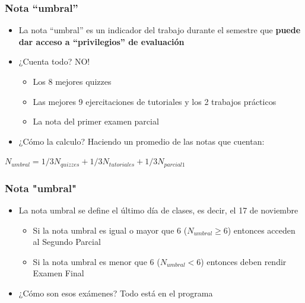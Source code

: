 \documentclass{beamer}
\begin{document}
\begin{frame}
\frametitle{Nota ``umbral''}
\begin{itemize}
    \item La nota ``umbral'' es un indicador del trabajo durante el semestre que \textbf{puede dar acceso a ``privilegios'' de evaluación} \vspace{2mm}
    \item ¿Cuenta todo? NO!
        \begin{itemize}
            \item Los 8 mejores quizzes
            \item Las mejores 9 ejercitaciones de tutoriales y los 2 trabajos prácticos
            \item La nota del primer examen parcial
        \end{itemize} \vspace{2mm}
    \item ¿Cómo la calculo? Haciendo un promedio de las notas que cuentan:
    \end{itemize}
    \begin{center}
    $N_{umbral}=1/3N_{quizzes}+1/3N_{tutoriales}+1/3N_{parcial 1}$    
    \end{center}
    
\end{frame}

\begin{frame}
\frametitle{Nota "umbral"}
\begin{itemize}
    \item La nota umbral se define el último día de clases, es decir, el 17 de noviembre    
    \begin{itemize} \vspace{2mm}
            \item Si la nota umbral es igual o mayor que 6 ($N_{umbral} \geq 6$) entonces acceden al Segundo Parcial
            \item Si la nota umbral es menor que 6 ($N_{umbral} < 6$) entonces deben rendir Examen Final      \end{itemize} \vspace{2mm}
            
    \item ¿Cómo son esos exámenes? Todo está en el programa
            \end{itemize}
\end{frame}
\end{document}
